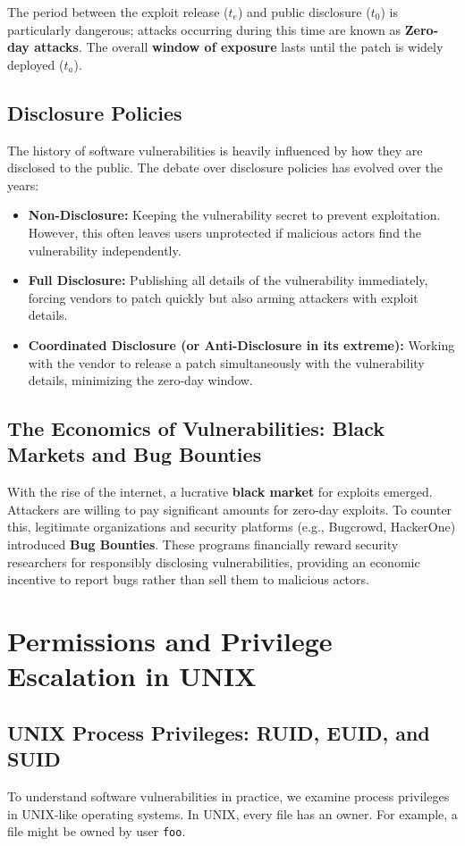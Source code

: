 The period between the exploit release ($t_e$) and public disclosure ($t_0$) is particularly dangerous; attacks occurring during this time are known as \textbf{Zero-day attacks}. The overall \textbf{window of exposure} lasts until the patch is widely deployed ($t_a$).

\subsection{Disclosure Policies}
The history of software vulnerabilities is heavily influenced by how they are disclosed to the public. The debate over disclosure policies has evolved over the years:
\begin{itemize}
    \item \textbf{Non-Disclosure:} Keeping the vulnerability secret to prevent exploitation. However, this often leaves users unprotected if malicious actors find the vulnerability independently.
    \item \textbf{Full Disclosure:} Publishing all details of the vulnerability immediately, forcing vendors to patch quickly but also arming attackers with exploit details.
    \item \textbf{Coordinated Disclosure (or Anti-Disclosure in its extreme):} Working with the vendor to release a patch simultaneously with the vulnerability details, minimizing the zero-day window.
\end{itemize}

\subsection{The Economics of Vulnerabilities: Black Markets and Bug Bounties}
With the rise of the internet, a lucrative \textbf{black market} for exploits emerged. Attackers are willing to pay significant amounts for zero-day exploits. To counter this, legitimate organizations and security platforms (e.g., Bugcrowd, HackerOne) introduced \textbf{Bug Bounties}. These programs financially reward security researchers for responsibly disclosing vulnerabilities, providing an economic incentive to report bugs rather than sell them to malicious actors.

\section{Permissions and Privilege Escalation in UNIX}

\subsection{UNIX Process Privileges: RUID, EUID, and SUID}
To understand software vulnerabilities in practice, we examine process privileges in UNIX-like operating systems. In UNIX, every file has an owner. For example, a file might be owned by user \texttt{foo}.

